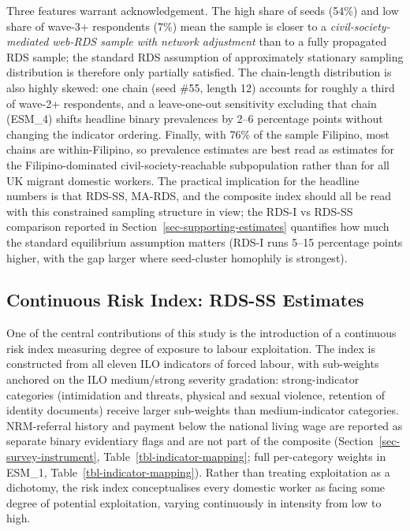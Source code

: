\documentclass[
  12pt,
  letterpaper,
  DIV=11,
  numbers=noendperiod]{scrartcl}
\begin{document}
Three features warrant acknowledgement. The high share of seeds (54\%)
and low share of wave-3+ respondents (7\%) mean the sample is closer to
a \emph{civil-society-mediated web-RDS sample with network adjustment}
than to a fully propagated RDS sample; the standard RDS assumption of
approximately stationary sampling distribution is therefore only
partially satisfied. The chain-length distribution is also highly
skewed: one chain (seed \#55, length 12) accounts for roughly a third of
wave-2+ respondents, and a leave-one-out sensitivity excluding that
chain (ESM\_4) shifts headline binary prevalences by 2--6 percentage
points without changing the indicator ordering. Finally, with 76\% of
the sample Filipino, most chains are within-Filipino, so prevalence
estimates are best read as estimates for the Filipino-dominated
civil-society-reachable subpopulation rather than for all UK migrant
domestic workers. The practical implication for the headline numbers is
that RDS-SS, MA-RDS, and the composite index should all be read with
this constrained sampling structure in view; the RDS-I vs RDS-SS
comparison reported in Section~\ref{sec-supporting-estimates} quantifies
how much the standard equilibrium assumption matters (RDS-I runs 5--15
percentage points higher, with the gap larger where seed-cluster
homophily is strongest).

\subsection{Continuous Risk Index: RDS-SS
Estimates}\label{sec-composite-results}

One of the central contributions of this study is the introduction of a
continuous risk index measuring degree of exposure to labour
exploitation. The index is constructed from all eleven ILO indicators of
forced labour, with sub-weights anchored on the ILO medium/strong
severity gradation: strong-indicator categories (intimidation and
threats, physical and sexual violence, retention of identity documents)
receive larger sub-weights than medium-indicator categories.
NRM-referral history and payment below the national living wage are
reported as separate binary evidentiary flags and are not part of the
composite (Section~\ref{sec-survey-instrument},
Table~\ref{tbl-indicator-mapping}; full per-category weights in ESM\_1,
Table~\ref{tbl-indicator-mapping}). Rather than treating exploitation as
a dichotomy, the risk index conceptualises every domestic worker as
facing some degree of potential exploitation, varying continuously in
intensity from low to high.
\end{document}
